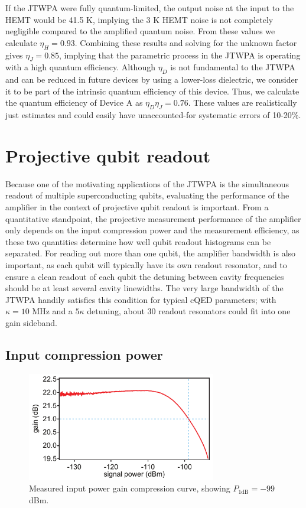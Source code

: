 If the JTWPA were fully quantum-limited, the output noise at the input to the HEMT would be 41.5 K, implying the 3 K HEMT noise is not completely negligible compared to the amplified quantum noise.  From these values we calculate $\eta_H = 0.93$.  Combining these results and solving for the unknown factor gives $\eta_J = 0.85$, implying that the parametric process in the JTWPA is operating with a high quantum efficiency.  Although $\eta_D$ is not fundamental to the JTWPA and can be reduced in future devices by using a lower-loss dielectric, we consider it to be part of the intrinsic quantum efficiency of this device. Thus, we calculate the quantum efficiency of Device A as $\eta_D \eta_J = 0.76$.  These values are realistically just estimates and could easily have unaccounted-for systematic errors of 10-20\%.

\section{Projective qubit readout}

Because one of the motivating applications of the JTWPA is the simultaneous readout of multiple superconducting qubits, evaluating the performance of the amplifier in the context of projective qubit readout is important.  From a quantitative standpoint, the projective measurement performance of the amplifier only depends on the input compression power and the measurement efficiency, as these two quantities determine how well qubit readout histograms can be separated.  For reading out more than one qubit, the amplifier bandwidth is also important, as each qubit will typically have its own readout resonator, and to ensure a clean readout of each qubit the detuning between cavity frequencies should be at least several cavity linewidths.  The very large bandwidth of the JTWPA handily satisfies this condition for typical cQED parameters; with $\kappa = 10$ MHz and a $5\kappa$ detuning, about 30 readout resonators could fit into one gain sideband.

\subsection{Input compression power}

\begin{figure}
\begin{center}
\includegraphics[width=3.24in]{twpa_exp/dr}
\end{center}
\caption[JTWPA input compression]{Measured input power gain compression curve, showing $P_{1\mathrm{dB}} = -99$ dBm.}
\label{fig:dr}
\end{figure}


